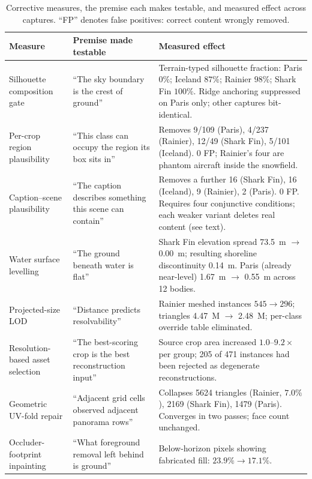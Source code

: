 \begin{table}[t]
\centering
\small
\caption{Corrective measures, the premise each makes testable, and measured effect
across captures. ``FP'' denotes false positives: correct content wrongly removed.}
\label{tab:fixes}
\begin{tabular}{@{}p{3.3cm}p{4.5cm}p{6.2cm}@{}}
\toprule
\textbf{Measure} & \textbf{Premise made testable} & \textbf{Measured effect} \\
\midrule
Silhouette composition gate &
``The sky boundary is the crest of ground'' &
Terrain-typed silhouette fraction: Paris $0\%$; Iceland $87\%$; Rainier $98\%$;
Shark Fin $100\%$. Ridge anchoring suppressed on Paris only; other captures
bit-identical. \\
\addlinespace
Per-crop region plausibility &
``This class can occupy the region its box sits in'' &
Removes 9/109 (Paris), 4/237 (Rainier), 12/49 (Shark Fin), 5/101 (Iceland).
0 FP; Rainier's four are phantom aircraft inside the snowfield. \\
\addlinespace
Caption--scene plausibility &
``The caption describes something this scene can contain'' &
Removes a further 16 (Shark Fin), 16 (Iceland), 9 (Rainier), 2 (Paris). 0 FP.
Requires four conjunctive conditions; each weaker variant deletes real content
(see text). \\
\addlinespace
Water surface levelling &
``The ground beneath water is flat'' &
Shark Fin elevation spread \SI{73.5}{\meter} $\rightarrow$ \SI{0.00}{\meter};
resulting shoreline discontinuity \SI{0.14}{\meter}. Paris (already near-level)
\SI{1.67}{\meter} $\rightarrow$ \SI{0.55}{\meter} across 12 bodies. \\
\addlinespace
Projected-size LOD &
``Distance predicts resolvability'' &
Rainier meshed instances $545 \rightarrow 296$; triangles
\SI{4.47}{M} $\rightarrow$ \SI{2.48}{M}; per-class override table eliminated. \\
\addlinespace
Resolution-based asset selection &
``The best-scoring crop is the best reconstruction input'' &
Source crop area increased $1.0$--$9.2\times$ per group; \num{205} of \num{471}
instances had been rejected as degenerate reconstructions. \\
\addlinespace
Geometric UV-fold repair &
``Adjacent grid cells observed adjacent panorama rows'' &
Collapses \num{5624} triangles (Rainier, $7.0\%$), \num{2169} (Shark Fin),
\num{1479} (Paris). Converges in two passes; face count unchanged. \\
\addlinespace
Occluder-footprint inpainting &
``What foreground removal left behind is ground'' &
Below-horizon pixels showing fabricated fill: $23.9\% \rightarrow 17.1\%$. \\
\bottomrule
\end{tabular}
\end{table}

